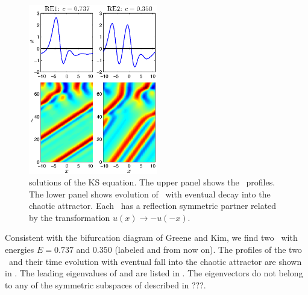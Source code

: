 {\begin{figure}[t] \label{f:ks22RE}
\begin{center} 
\includegraphics[width=0.5\textwidth]{figs/ks22_RE1-2.eps}
\end{center}
\caption{
{\Reqv} %
solutions of the KS equation. 
The upper panel shows
the \reqva\ profiles. The lower panel shows evolution
of \reqva\ with eventual decay into the chaotic attractor.
Each \reqv\ has a reflection symmetric partner related by the
transformation $u(x) \to -u(-x)$.
}
\end{figure}

Consistent with the bifurcation diagram of Greene and Kim,
we find two \reqva\ with energies $E = 0.737$ and $0.350$
(labeled  and  from now on).
The profiles of the two \reqva\ and their time evolution
with eventual fall into the chaotic attractor are
shown in .  The leading eigenvalues of
 and  are listed in .  
The eigenvectors
do not belong to any of the symmetric subspaces of {\KSe}
described in ???.

}
